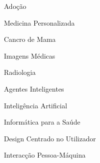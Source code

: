 
\Large
Adoção

\vspace{10.00mm}

\Large
Medicina Personalizada

\vspace{10.00mm}

\Large
Cancro de Mama

\vspace{10.00mm}

\Large
Imagens M\'{e}dicas

\vspace{10.00mm}

\Large
Radiologia

\vspace{10.00mm}

\Large
Agentes Inteligentes

\vspace{10.00mm}

\Large
Intelig\^{e}ncia Artificial

\vspace{10.00mm}

\Large
Inform\'{a}tica para a Sa\'{u}de

\vspace{10.00mm}

\Large
Design Centrado no Utilizador

\vspace{10.00mm}

\Large
Interac\c{c}\~{a}o Pessoa-M\'{a}quina